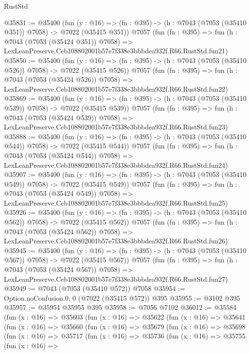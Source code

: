 \begin{lexlean}{RustStd}
\begin{coremodule}
@35831 := @35400
    (fun (y : @16) => (fn : @395) -> (h : @7043 (@7053 (@35410 @351)) @7058) -> @7022 (@35415 @351))
    @7057
    (fun (fn : @395) =>
    fun (h : @7043 (@7053 (@35424 @351)) @7058) =>
    LexLeanPreserve.Ceb108802001b57e7f338e3bbbdea932f.R66.RustStd.fun21)
@35850 := @35400
    (fun (y : @16) => (fn : @395) -> (h : @7043 (@7053 (@35410 @526)) @7058) -> @7022 (@35415 @526))
    @7057
    (fun (fn : @395) =>
    fun (h : @7043 (@7053 (@35424 @526)) @7058) =>
    LexLeanPreserve.Ceb108802001b57e7f338e3bbbdea932f.R66.RustStd.fun22)
@35869 := @35400
    (fun (y : @16) => (fn : @395) -> (h : @7043 (@7053 (@35410 @539)) @7058) -> @7022 (@35415 @539))
    @7057
    (fun (fn : @395) =>
    fun (h : @7043 (@7053 (@35424 @539)) @7058) =>
    LexLeanPreserve.Ceb108802001b57e7f338e3bbbdea932f.R66.RustStd.fun23)
@35888 := @35400
    (fun (y : @16) => (fn : @395) -> (h : @7043 (@7053 (@35410 @544)) @7058) -> @7022 (@35415 @544))
    @7057
    (fun (fn : @395) =>
    fun (h : @7043 (@7053 (@35424 @544)) @7058) =>
    LexLeanPreserve.Ceb108802001b57e7f338e3bbbdea932f.R66.RustStd.fun24)
@35907 := @35400
    (fun (y : @16) => (fn : @395) -> (h : @7043 (@7053 (@35410 @549)) @7058) -> @7022 (@35415 @549))
    @7057
    (fun (fn : @395) =>
    fun (h : @7043 (@7053 (@35424 @549)) @7058) =>
    LexLeanPreserve.Ceb108802001b57e7f338e3bbbdea932f.R66.RustStd.fun25)
@35926 := @35400
    (fun (y : @16) => (fn : @395) -> (h : @7043 (@7053 (@35410 @562)) @7058) -> @7022 (@35415 @562))
    @7057
    (fun (fn : @395) =>
    fun (h : @7043 (@7053 (@35424 @562)) @7058) =>
    LexLeanPreserve.Ceb108802001b57e7f338e3bbbdea932f.R66.RustStd.fun26)
@35945 := @35400
    (fun (y : @16) => (fn : @395) -> (h : @7043 (@7053 (@35410 @567)) @7058) -> @7022 (@35415 @567))
    @7057
    (fun (fn : @395) =>
    fun (h : @7043 (@7053 (@35424 @567)) @7058) =>
    LexLeanPreserve.Ceb108802001b57e7f338e3bbbdea932f.R66.RustStd.fun27)
@35949 := @7043 (@7053 (@35410 @572)) @7058
@35954 := Option.noConfusion.{0, 0} (@7022 (@35415 @572)) @395
@35955 := @3102 @395
@35957 := @35954 @35955 @395
@35958 := @7056 @7102
@36012 := @35584
    (fun (x : @16) =>
    @35603
      (fun (x : @16) =>
      @35622
        (fun (x : @16) =>
        @35641
          (fun (x : @16) =>
          @35660
            (fun (x : @16) =>
            @35679
              (fun (x : @16) =>
              @35698
                (fun (x : @16) =>
                @35717
                  (fun (x : @16) =>
                  @35736
                    (fun (x : @16) =>
                    @35755
                      (fun (x : @16) =>

\end{coremodule}
\end{lexlean}
